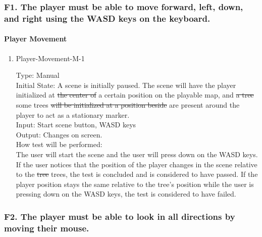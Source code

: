 \documentclass[12pt, titlepage]{article}
\DeclareRobustCommand{\hsout}[1]{\texorpdfstring{\sout{#1}}{#1}}
\newcounter{ftnum}
\begin{document}
\subsubsection{{\color{magenta} F1.} The player must be able to move forward, left, down, and right using the WASD keys {\color{magenta} on the keyboard.}}
		
\paragraph{Player Movement} 

\begin{enumerate} 

\item{Player-Movement-M-1\\}  \label{F1-1}

Type: Manual \\
					
Initial State: A scene is initially paused. The scene will have the player initialized at \hsout{the center of} {\color{magenta} a certain position on }the playable map, and \hsout{a tree} {\color{magenta} some trees } \hsout{will be initialized at a position beside} {\color{magenta} are present around} the player to act as a stationary marker.\\
					
Input: Start scene button, WASD keys \\
					
Output: Changes on screen. \\
					
How test will be performed:\\ The user will start the scene and the user will press down on the WASD keys. If the user notices that the position of the player changes in the scene relative to the \hsout{tree} {\color{magenta}trees}, the test is concluded and is considered to have passed. If the player position stays the same relative to the tree's position while the user is pressing down on the WASD keys, the test is considered to have failed. \\

\end{enumerate}

\subsubsection{{\color{magenta} F2.} The player must be able to look in all directions by moving their mouse.} 
		
\end{document}
